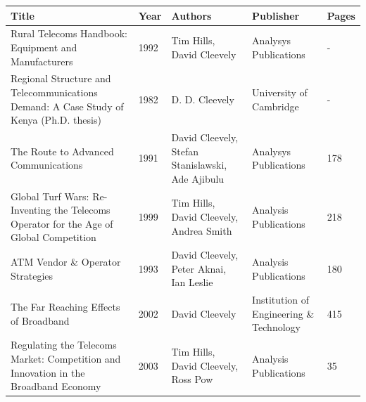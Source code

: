 \documentclass{article}
\begin{document}
\begin{tabular}{lllll}
\toprule
Title & Year & Authors & Publisher & Pages \\
\midrule
Rural Telecoms Handbook: Equipment and Manufacturers & 1992 & Tim Hills, David Cleevely & Analysys Publications & - \\
Regional Structure and Telecommunications Demand: A Case Study of Kenya (Ph.D. thesis) & 1982 & D. D. Cleevely & University of Cambridge & - \\
The Route to Advanced Communications & 1991 & David Cleevely, Stefan Stanislawski, Ade Ajibulu & Analysys Publications & 178 \\
Global Turf Wars: Re-Inventing the Telecoms Operator for the Age of Global Competition & 1999 & Tim Hills, David Cleevely, Andrea Smith & Analysis Publications & 218 \\
ATM Vendor \& Operator Strategies & 1993 & David Cleevely, Peter Aknai, Ian Leslie & Analysis Publications & 180 \\
The Far Reaching Effects of Broadband & 2002 & David Cleevely & Institution of Engineering \& Technology & 415 \\
Regulating the Telecoms Market: Competition and Innovation in the Broadband Economy & 2003 & Tim Hills, David Cleevely, Ross Pow & Analysis Publications & 35 \\
\bottomrule
\end{tabular}
\end{document}
